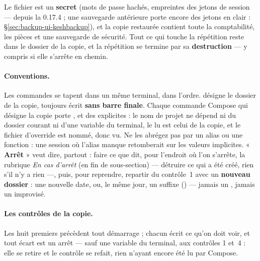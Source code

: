 \documentclass[a4paper,11pt,oneside]{article}
\begin{document}
\begin{keshwarning}[title=\faExclamationTriangle\ La copie porte les données réelles]
Le fichier  est un \textbf{secret} (mots de passe hachés, empreintes des jetons de session --- depuis la 0.17.4 ; une sauvegarde antérieure porte encore des jetons en clair : \S\ref{sec:backup-ui-keshbackup}), et la copie restaurée contient toute la comptabilité, les pièces et une sauvegarde de sécurité. Tout ce qui touche la répétition reste dans le dossier de la copie, et la répétition se termine par sa \textbf{destruction} --- y compris si elle s'arrête en chemin.
\end{keshwarning}

\paragraph{Conventions.} Les commandes se tapent dans un même terminal, dans l'ordre.  désigne le dossier de la copie, toujours écrit \textbf{sans barre finale}. Chaque commande Compose qui désigne la copie porte ,  et des  explicites : le nom de projet ne dépend ni du dossier courant ni d'une variable du terminal, le  lu est celui de la copie, et le fichier d'override est nommé, donc vu. Ne les abrégez pas par un alias ou une fonction : une session où l'alias manque retomberait sur les valeurs implicites. « \textbf{Arrêt} » veut dire, partout : faire ce que dit, pour l'endroit où l'on s'arrête, la rubrique \emph{En cas d'arrêt} (en fin de sous-section) --- détruire ce qui a été créé, rien s'il n'y a rien ---, puis, pour reprendre, repartir du contrôle~1 avec un \textbf{nouveau dossier} : une nouvelle date, ou, le même jour, un suffixe () --- jamais un , jamais un  improvisé.

\paragraph{Les contrôles de la copie.} Les huit premiers précèdent tout démarrage ; chacun écrit ce qu'on doit voir, et tout écart est un arrêt --- sauf une variable du terminal, aux contrôles 1 et~4 : elle se retire et le contrôle se refait, rien n'ayant encore été lu par Compose.
\end{document}
